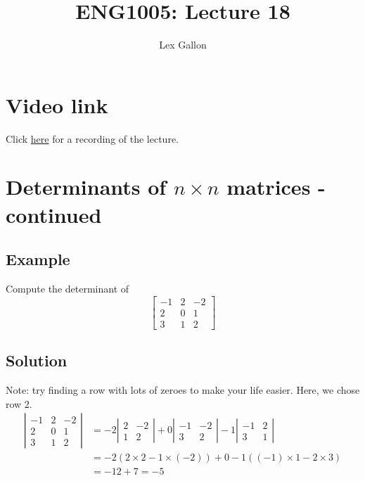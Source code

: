 \documentclass[11pt]{article}
\begin{document}
\title{ENG1005: Lecture 18}
\author{Lex Gallon}
\maketitle

\tableofcontents

\section*{Video link}
Click \href{https://echo360.org.au/lesson/G_35fe23e0-41ee-4e6f-b0f5-05f4155bb7b0_b944cecf-8ba5-40d3-a870-0243a0a9e78c_2020-04-30T15:58:00.000_2020-04-30T16:53:00.000/classroom#sortDirection=desc}{here} for a recording of the lecture.

\section{Determinants of $n \times n$ matrices - continued}
\subsection{Example}
Compute the determinant of
\[
\begin{bmatrix}
-1 & 2 & -2 \\
2 & 0 & 1 \\
3 & 1 & 2
\end{bmatrix}
\]

\subsection{Solution}
Note: try finding a row with lots of zeroes to make your life easier. Here, we chose row 2.
\begin{align*}
\left|
\begin{matrix}
-1 & 2 & -2 \\
2 & 0 & 1 \\
3 & 1 & 2
\end{matrix}
\right|
&= 
-2 \left|
\begin{matrix}
2 & -2\\
1 & 2
\end{matrix}
\right| 
+
0 \left|
\begin{matrix}
-1 & -2 \\
3 & 2
\end{matrix}
\right|
-1 \left|
\begin{matrix}
-1 & 2 \\
3 & 1
\end{matrix}
\right| \\
&=
-2 (2 \times 2 - 1 \times (-2) ) + 0 -1 ((-1) \times 1 - 2 \times 3) \\
&= -12 +7 = -5
\end{align*}
\end{document}
